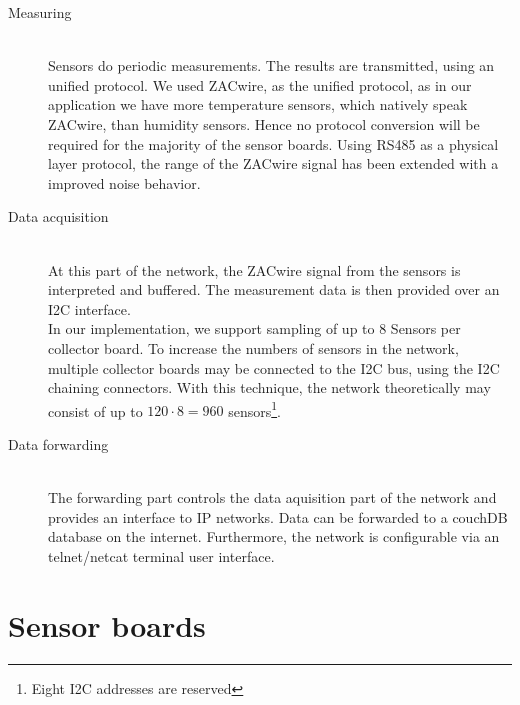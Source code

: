 \documentclass[a4paper]{scrreprt}
\begin{document}
\begin{description}
  \item[Measuring]\hfill \\
    Sensors do periodic measurements. The results are transmitted,
    using an unified protocol. We used ZACwire, as the unified
    protocol, as in our application we have more temperature sensors,
    which natively speak ZACwire, than humidity sensors. Hence no
    protocol conversion will be required for the majority of the
    sensor boards. 
    Using RS485 as a physical layer protocol, the range of the
    ZACwire signal has been extended with a improved noise behavior.
  \item[Data acquisition]\hfill \\
    At this part of the network, the ZACwire signal from the sensors
    is interpreted and buffered. The measurement data is then
    provided over an I2C interface.\\
    In our implementation, we support sampling of up to 8 Sensors
    per collector board. To increase the numbers of sensors in the
    network, multiple collector boards may be connected to the I2C
    bus, using the I2C chaining connectors. With this technique,
    the network theoretically may consist of up to
    $120\cdot 8 = 960$ sensors\footnote{Eight I2C addresses are reserved}.
  \item[Data forwarding]\hfill \\
    The forwarding part controls the data aquisition part of the
    network and provides an interface to IP networks. Data can be
    forwarded to a couchDB database on the internet. Furthermore, the network 
    is configurable via an telnet/netcat terminal user interface.
\end{description}
\section{Sensor boards} \label{chap:sensorbrd}
\end{document}
